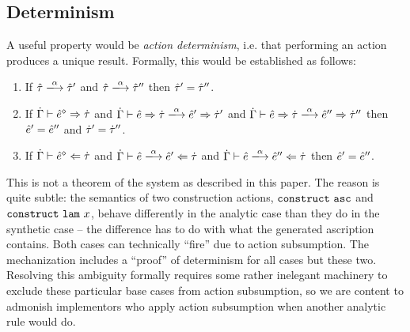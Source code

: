 \subsection{Determinism}
A useful property would be \emph{action determinism}, i.e. that performing
an action produces a unique result. Formally, this would be established as
follows:
\begin{enumerate}[itemsep=0px,partopsep=0px,topsep=0px]
\item If $\performTyp{\ztau}{\alpha}{\ztau'}$ and
$\performTyp{\ztau}{\alpha}{\ztau''}$ then $\hat{\tau}'=\hat{\tau}''$.
\item If $\dot{\Gamma} \vdash \hat{e}^{\diamond} \Rightarrow \dot{\tau}$ and
  $\performSyn{\hGamma}{\zexp}{\htau}{\alpha}{\zexp'}{\htau'}$ and
  $\performSyn{\hGamma}{\zexp}{\htau}{\alpha}{\zexp''}{\htau''}$ then
  $\hat{e}' = \hat{e}''$ and $\dot{\tau}' = \dot{\tau}''$.
\item If $\dot{\Gamma} \vdash \hat{e}^{\diamond} \Leftarrow \dot{\tau}$ and
  $\performAna{\hGamma}{\zexp}{\htau}{\alpha}{\zexp'}$ and
  $\performAna{\hGamma}{\zexp}{\htau}{\alpha}{\zexp''}$ then $\hat{e}' =
  \hat{e}''$.
\end{enumerate}

This is not a theorem of the system as described in this paper. The reason
is quite subtle: the semantics of two construction actions,
$\mathtt{construct}~\mathtt{asc}$ and $\mathtt{construct}~\mathtt{lam}~x$, behave differently in the
analytic case than they do in the synthetic case -- the difference has to
do with what the generated ascription contains. Both cases can technically
``fire'' due to action subsumption. The mechanization includes a ``proof''
of determinism for all cases but these two. Resolving this ambiguity
formally requires some rather inelegant machinery to exclude these
particular base cases from action subsumption, so we are content to
admonish implementors who apply action subsumption when another analytic
rule would do.
